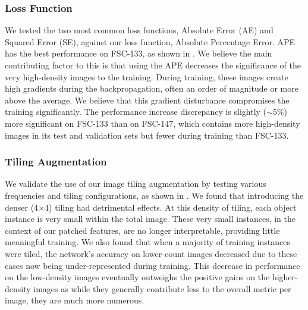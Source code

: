 \documentclass[../thesis.tex]{subfiles}
\begin{document}
\begin{table}
    \centering
    
    \caption{Performance of different feature backbones, and two more complex count regression head architectures on FSC-133.
    }
    \label{table__LTCA__ablation_arch}
\end{table}



\subsubsection{Loss Function}\label{sec__LTCA__ablation_loss_functions}
We tested the two most common loss functions, Absolute Error (AE) and Squared Error (SE), against our loss function, Absolute Percentage Error.
APE has the best performance on FSC-133, as shown in . We believe the main contributing factor to this is that using the APE decreases the significance of the very high-density images to the training. 
During training, these images create high gradients during the backpropagation, often an order of magnitude or more above the average. We believe that this gradient disturbance compromises the training significantly.
The performance increase discrepancy is slightly ($\sim$5\%) more significant on FSC-133 than on FSC-147, which contains more high-density images in its test and validation sets but fewer during training than FSC-133.


\begin{table}
    \centering
    
    \caption{Performance of RCC on FSC-133 with different loss functions.
    }
    \label{table__LTCA__ablation_loss_functions}
\end{table}









\subsubsection{Tiling Augmentation}\label{sec__LTCA__append_tile}
We validate the use of our image tiling augmentation by testing various frequencies and tiling configurations, as shown in . 
We found that introducing the denser (4$\times$4) tiling had detrimental effects. 
At this density of tiling, each object instance is very small within the total image. These very small instances, in the context of our patched features, are no longer interpretable, providing little meaningful training. We also found that when a majority of training instances were tiled, the network's accuracy on lower-count images decreased due to these cases now being under-represented during training. This decrease in performance on the low-density images eventually outweighs the positive gains on the higher-density images as while they generally contribute less to the overall metric per image, they are much more numerous.
\end{document}
